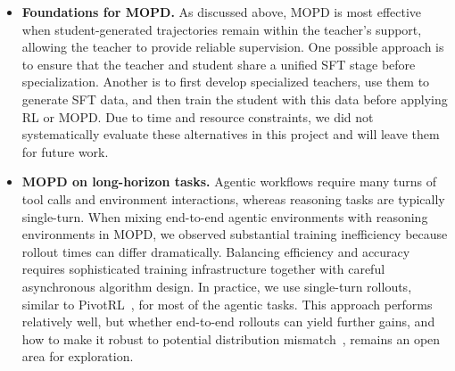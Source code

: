 \begin{itemize}
\item \textbf{Foundations for MOPD.}
As discussed above, MOPD is most effective when student-generated trajectories remain within the teacher's support, allowing the teacher to provide reliable supervision. One possible approach is to ensure that the teacher and student share a unified SFT stage before specialization. Another is to first develop specialized teachers, use them to generate SFT data, and then train the student with this data before applying RL or MOPD. Due to time and resource constraints, we did not systematically evaluate these alternatives in this project and will leave them for future work.
\item \textbf{MOPD on long-horizon tasks.}
Agentic workflows require many turns of tool calls and environment interactions, whereas reasoning tasks are typically single-turn. When mixing end-to-end agentic environments with reasoning environments in MOPD, we observed substantial training inefficiency because rollout times can differ dramatically. Balancing efficiency and accuracy requires sophisticated training infrastructure together with careful asynchronous algorithm design. In practice, we use single-turn rollouts, similar to PivotRL~\citep{yi2026pivotrl}, for most of the agentic tasks. This approach performs relatively well, but whether end-to-end rollouts can yield further gains, and how to make it robust to potential distribution mismatch~\citep{wang2026tcod}, remains an open area for exploration.

\end{itemize}

